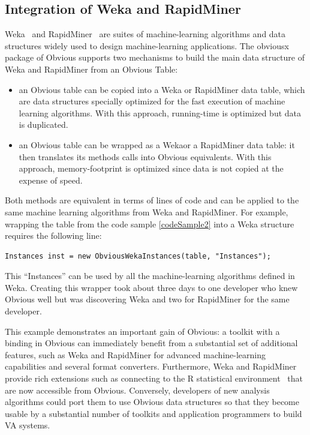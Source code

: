 \subsection{Integration of Weka and RapidMiner}

Weka~\cite{Weka} and RapidMiner~\cite{RapidMiner} are suites of
machine-learning algorithms and data structures widely used to design
machine-learning applications.  The obviousx package of Obvious
supports two mechanisms to build the main data structure of Weka and
RapidMiner from an Obvious Table:
\begin{itemize}[noitemsep,topsep=0pt]
\item an Obvious table can be copied into a Weka or RapidMiner data
  table, which are data structures specially optimized for the fast
  execution of machine learning algorithms.  With this approach,
  running-time is optimized but data is duplicated.
\item an Obvious table can be wrapped as a Wekaor a
  RapidMiner data table: it then translates its methods calls into
  Obvious equivalents.  With this approach, memory-footprint is
  optimized since data is not copied at the expense of speed.
\end{itemize}

Both methods are equivalent in terms of lines of code and can be
applied to the same machine learning algorithms from Weka and
RapidMiner.  For example, wrapping the table from the code sample
\ref{codeSample2} into a Weka structure requires the following
line:

\begin{lstlisting}[caption={Wrapping an Obvious Table into Weka Instances},label=wekaExample]
Instances inst = new ObviousWekaInstances(table, "Instances");
\end{lstlisting}


This ``Instances'' can be used by all the machine-learning algorithms
defined in Weka.  Creating this wrapper took about three days to one
developer who knew Obvious well but was discovering Weka and two for
RapidMiner for the same developer.

This example demonstrates an important gain of Obvious: a toolkit with
a binding in Obvious can immediately benefit from a substantial set of
additional features, such as Weka and RapidMiner for advanced
machine-learning capabilities and several format converters.
Furthermore, Weka and RapidMiner provide rich extensions such as
connecting to the R statistical environment~\cite{R} that are now
accessible from Obvious.  Conversely, developers of new analysis
algorithms could port them to use Obvious data structures so that they
become usable by a substantial number of toolkits and application
programmers to build VA systems.


